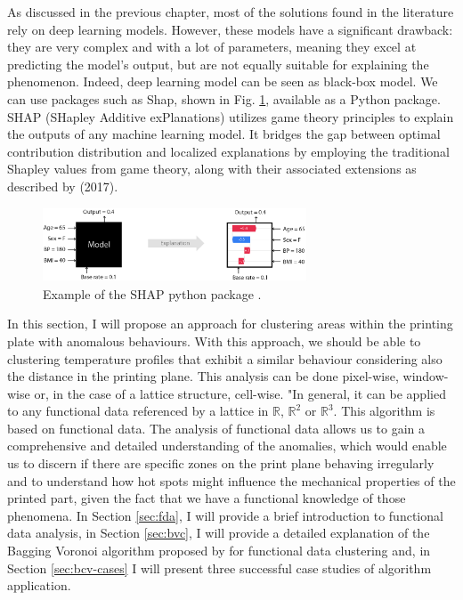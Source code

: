 As discussed in the previous chapter, most of the solutions found in the literature rely on deep learning models. However, these models have a significant drawback: they are very complex and with a lot of parameters, meaning they excel at predicting the model's output, but are not equally suitable for explaining the phenomenon. Indeed, deep learning model can be seen as black-box model. We can use packages such as Shap, shown in Fig. \ref{fig:shap}, available as a Python package. SHAP (SHapley Additive exPlanations) utilizes game theory principles to explain the outputs of any machine learning model. It bridges the gap between optimal contribution distribution and localized explanations by employing the traditional Shapley values from game theory, along with their associated extensions as described by \citeauthor{lundberg_unified_2017} (2017).
\begin{figure}
    \centering
    \includegraphics[width=0.7\textwidth]{Images/shap.png}
    \caption[SHAP python package.]{Example of the SHAP python package \cite{scott_lundberg_shap_2023}.}
    \label{fig:shap}
\end{figure}

In this section, I will propose an approach for clustering areas within the printing plate with anomalous behaviours. With this approach, we should be able to clustering temperature profiles that exhibit a similar behaviour considering also the distance in the printing plane. This analysis can be done pixel-wise, window-wise or, in the case of a lattice structure, cell-wise. "In general, it can be applied to any functional data referenced by a lattice in $\mathbb{R}$, $\mathbb{R}^2$ or $\mathbb{R}^3$. This algorithm is based on functional data. The analysis of functional data allows us to gain a comprehensive and detailed understanding of the anomalies, which would enable us to discern if there are specific zones on the print plane behaving irregularly and to understand how hot spots might influence the mechanical properties of the printed part, given the fact that we have a functional knowledge of those phenomena. In Section \ref{sec:fda}, I will provide a brief introduction to functional data analysis, in Section \ref{sec:bvc}, I will provide a detailed explanation of the Bagging Voronoi algorithm proposed by \citeauthor{secchi_bagging_2013} for functional data clustering and, in Section \ref{sec:bcv-cases} I will present three successful case studies of algorithm application.

